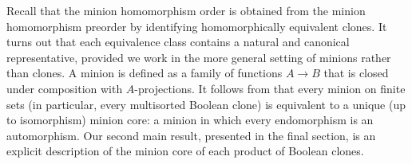 \documentclass{amsart}
\numberwithin{equation}{section}
\theoremstyle{plain}
\theoremstyle{definition}
\begin{document}
Recall that
the minion homomorphism order is obtained from the minion homomorphism preorder by identifying homomorphically equivalent clones.
It turns out that each equivalence class contains a natural and canonical representative, provided we work in the more general setting of minions rather than clones. A minion is defined as a family of functions $A \to B$ that is closed under composition with $A$-projections. It follows from \cite{kapytka} that every minion on finite sets (in particular, every multisorted Boolean clone) is equivalent to a unique (up to isomorphism) minion core: a minion in which every endomorphism is an automorphism. 
Our second main result, presented in the final section, is an explicit description of the minion core of each product of Boolean clones.

\begin{figure}
\end{figure}
\end{document}

